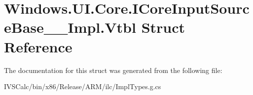 \hypertarget{struct_windows_1_1_u_i_1_1_core_1_1_i_core_input_source_base_____impl_1_1_vtbl}{}\section{Windows.\+U\+I.\+Core.\+I\+Core\+Input\+Source\+Base\+\_\+\+\_\+\+Impl.\+Vtbl Struct Reference}
\label{struct_windows_1_1_u_i_1_1_core_1_1_i_core_input_source_base_____impl_1_1_vtbl}


The documentation for this struct was generated from the following file\+:\begin{DoxyCompactItemize}
\item 
I\+V\+S\+Calc/bin/x86/\+Release/\+A\+R\+M/ilc/Impl\+Types.\+g.\+cs\end{DoxyCompactItemize}

